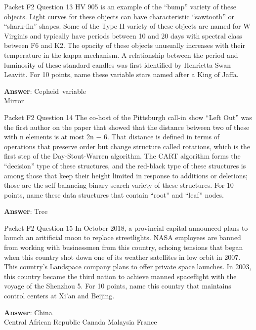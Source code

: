 \begin{frame}{Packet F2 Question 13}
HV 905 is an example of the “bump” variety of these objects. Light curves for these objects can have characteristic “sawtooth” or “shark-fin” shapes. Some of the Type II variety of these objects are named for W Virginis and   typically have periods between 10 and 20 days with spectral class between F6 and K2. The opacity of these objects unusually increases with their temperature in the kappa mechanism.   A relationship between the period and luminosity of these standard candles was first identified by Henrietta Swan Leavitt.   For 10 points, name these variable stars named after a King of Jaffa.  

\textbf{Answer}: Cepheid\ variable\\
 Mirror
\end{frame}

\begin{frame}{Packet F2 Question 14}
The co-host of the Pittsburgh call-in show ``Left Out'' was the first author on the paper that showed that the distance between two of these with n elements is at most 2n − 6.  That distance is defined in terms of operations that preserve order but change structure called rotations, which is the first step of the Day-Stout-Warren algorithm.  The CART algorithm forms the ``decision'' type of these structures, and the red-black type of these structures     is among those that keep their height limited in response to additions or deletions; those are the self-balancing binary search variety     of these structures. For 10 points, name these data structures that contain “root” and “leaf” nodes.

\textbf{Answer}: Tree\\
\end{frame}

\begin{frame}{Packet F2 Question 15}
In October 2018, a provincial capital announced plans to launch an aritificial moon to replace streetlights. NASA employees are banned from working with businessmen from this country, echoing tensions that began when this country shot down one of its weather satellites in low orbit in 2007. This country’s Landspace company plans to offer private space launches. In 2003, this country became the third nation to achieve manned spaceflight with the voyage of the Shenzhou 5. For 10 points, name this country that maintains control centers at Xi’an and Beijing.        

\textbf{Answer}: China\\
 Central African Republic
 Canada
 Malaysia
 France
\end{frame}


